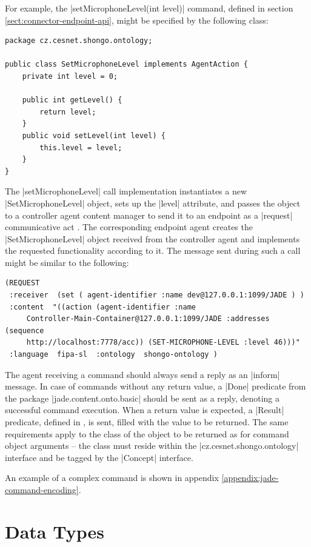 \documentclass[a4paper]{report}
\begin{document}
For example, the |setMicrophoneLevel(int level)| command, defined in section \ref{sect:connector-endpoint-api}, might be specified by the following class:
\begin{verbatim}
package cz.cesnet.shongo.ontology;

public class SetMicrophoneLevel implements AgentAction {
    private int level = 0;

    public int getLevel() {
        return level;
    }
    public void setLevel(int level) {
        this.level = level;
    }
}
\end{verbatim}
The |setMicrophoneLevel| call implementation instantiates a new |SetMicrophoneLevel| object, sets up the |level| attribute, and passes the object to a controller agent content manager to send it to an endpoint as a |request| communicative act \cite{FIPA-ComActSpec}. The corresponding endpoint agent creates the |SetMicrophoneLevel| object received from the controller agent and implements the requested functionality according to it. The message sent during such a call might be similar to the following:
\begin{verbatim}
(REQUEST
 :receiver  (set ( agent-identifier :name dev@127.0.0.1:1099/JADE ) )
 :content  "((action (agent-identifier :name
     Controller-Main-Container@127.0.0.1:1099/JADE :addresses (sequence
     http://localhost:7778/acc)) (SET-MICROPHONE-LEVEL :level 46)))"
 :language  fipa-sl  :ontology  shongo-ontology )
\end{verbatim}

The agent receiving a command should always send a reply as an |inform| \cite{FIPA-ComActSpec} message. In case of commands without any return value, a |Done| predicate from the package |jade.content.onto.basic| should be sent as a reply, denoting a successful command execution. When a return value is expected, a |Result| predicate, defined in \cite{FIPA-SL}, is sent, filled with the value to be returned. The same requirements apply to the class of the object to be returned as for command object arguments -- the class must reside within the |cz.cesnet.shongo.ontology| interface and be tagged by the |Concept| interface.

An example of a complex command is shown in appendix \ref{appendix:jade-command-encoding}.




\section{Data Types}
\end{document}
